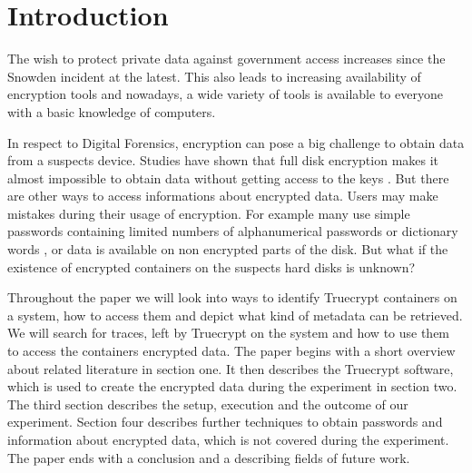 \section{Introduction}
The wish to protect private data against government access increases since the Snowden incident at the latest. 
This also leads to increasing availability of encryption tools and nowadays, a wide variety of tools is available to everyone with a basic knowledge of computers.

In respect to Digital Forensics, encryption can pose a big challenge to obtain data from a suspects device. 
Studies have shown that full disk encryption makes it almost impossible to obtain data without getting access to the keys \cite{Casey2011129}. 
But there are other ways to access informations about encrypted data.
Users may make mistakes during their usage of encryption. 
For example many use simple passwords containing limited numbers of alphanumerical passwords or dictionary words \cite{worstpractise}, or data is available on non encrypted parts of the disk. 
But what if the existence of encrypted containers on the suspects hard disks is unknown?

Throughout the paper we will look into ways to identify Truecrypt containers on a system, how to access them and depict what kind of metadata can be retrieved.
We will search for traces, left by Truecrypt on the system and how to use them to access the containers encrypted data.
The paper begins with a short overview about related literature in section one. 
It then describes the Truecrypt software, which is used to create the encrypted data during the experiment in section two. 
The third section describes the setup, execution and the outcome of our experiment. 
Section four describes further techniques to obtain passwords and information about encrypted data, which is not covered during the experiment. 
The paper ends with a conclusion and a describing fields of future work.
